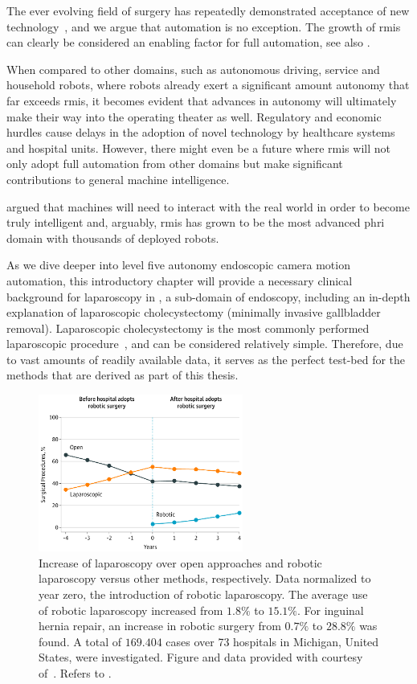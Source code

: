 The ever evolving field of surgery has repeatedly demonstrated acceptance of new technology~\cite{attanasio2021autonomoy}, and we argue that automation is no exception. The growth of \gls{rmis} can clearly be considered an enabling factor for full automation, see also .

When compared to other domains, such as autonomous driving, service and household robots, where robots already exert a significant amount autonomy that far exceeds \gls{rmis}, it becomes evident that advances in autonomy will ultimately make their way into the operating theater as well. Regulatory and economic hurdles cause delays in the adoption of novel technology by healthcare systems and hospital units. However, there might even be a future where \gls{rmis} will not only adopt full automation from other domains but make significant contributions to general machine intelligence. 

\citet{lecun2022path}
argued that machines will need to interact with the real world in order to become truly intelligent and, arguably, \gls{rmis} has grown to be the most advanced \gls{phri} domain with thousands of deployed robots.

As we dive deeper into level five autonomy endoscopic camera motion automation, this introductory chapter will provide a necessary clinical background for laparoscopy in , a sub-domain of endoscopy, including an in-depth explanation of laparoscopic cholecystectomy (minimally invasive gallbladder removal). Laparoscopic cholecystectomy is the most commonly performed laparoscopic procedure~\cite{sheetz2020trends}, and can be considered relatively simple. Therefore, due to vast amounts of readily available data, it serves as the perfect test-bed for the methods that are derived as part of this thesis. 
\begin{figure}[tbh]
    \centering
    \includegraphics[width=0.6\textwidth]{introduction/img/robotic_since_introduction.png}
    \caption{Increase of laparoscopy over open approaches and robotic laparoscopy versus other methods, respectively. Data normalized to year zero, the introduction of robotic laparoscopy. The average use of robotic laparoscopy increased from $1.8\%$ to $15.1\%$. For inguinal hernia repair, an increase in robotic surgery from $0.7\%$ to $28.8\%$ was found. A total of $169.404$ cases over 73 hospitals in Michigan, United States, were investigated. Figure and data provided with courtesy of~\cite{sheetz2020trends}. Refers to .}
    \label{in:fig:robotic_vs_laparoscopic_vs_open}
\end{figure}


